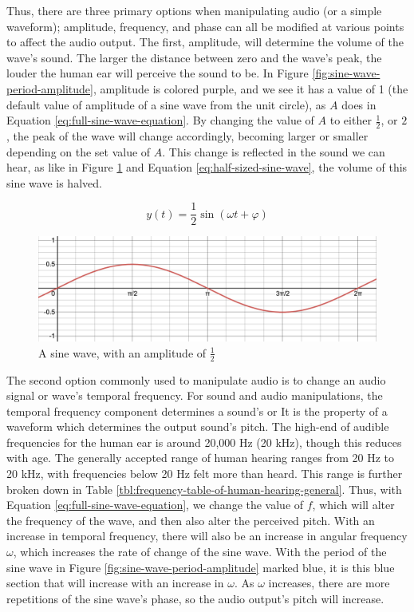 Thus, there are three primary options when manipulating audio (or a simple waveform); amplitude, frequency, and phase can all be modified at various points to affect the audio output. The first, amplitude, will determine the volume of the wave's sound. The larger the distance between zero and the wave's peak, the louder the human ear will perceive the sound to be\cite{Zjalic_2021}. In Figure \ref{fig:sine-wave-period-amplitude}, amplitude is colored purple, and we see it has a value of 1 (the default value of amplitude of a sine wave from the unit circle), as $A$ does in Equation \ref{eq:full-sine-wave-equation}. By changing the value of $A$ to either $\frac{1}{2}$, or $2$, the peak of the wave will change accordingly, becoming larger or smaller depending on the set value of $A$. This change is reflected in the sound we can hear, as like in Figure \ref{fig:half-sized-sine-wave} and Equation \ref{eq:half-sized-sine-wave}, the volume of this sine wave is halved.

\begin{equation}\label{eq:half-sized-sine-wave}
	y(t) = \frac{1}{2} \sin(\omega t + \varphi)
\end{equation}

\begin{figure}
	\centering
	\includegraphics[width=\textwidth]{figures/half-sized-sine-wave.png}
	\caption{A sine wave, with an amplitude of $\frac{1}{2}$}
	\label{fig:half-sized-sine-wave}
\end{figure}

The second option commonly used to manipulate audio is to change an audio signal or wave's temporal frequency. For sound and audio manipulations, the temporal frequency component determines a sound's  or  It is the property of a waveform which determines the output sound's pitch. The high-end of audible frequencies for the human ear is around 20,000 Hz (20 kHz), though this reduces with age. The generally accepted range of human hearing ranges from 20 Hz to 20 kHz, with frequencies below 20 Hz felt more than heard\cite{Rosen_Howell_2011}. This range is further broken down in Table \ref{tbl:frequency-table-of-human-hearing-general}. Thus, with Equation \ref{eq:full-sine-wave-equation}, we change the value of $f$, which will alter the frequency of the wave, and then also alter the perceived pitch. With an increase in temporal frequency, there will also be an increase in angular frequency $\omega$, which increases the rate of change of the sine wave. With the period of the sine wave in Figure \ref{fig:sine-wave-period-amplitude} marked blue, it is this blue section that will increase with an increase in $\omega$. As $\omega$ increases, there are more repetitions of the sine wave's phase, so the audio output's pitch will increase.

